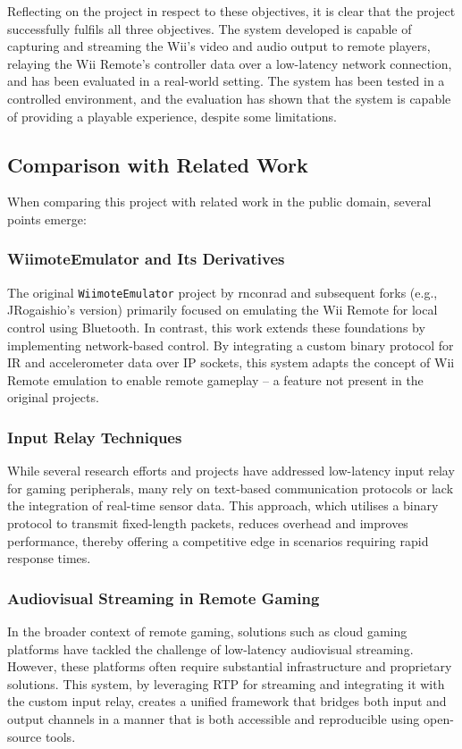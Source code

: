 Reflecting on the project in respect to these objectives, it is clear that the project successfully fulfils all three objectives. The system developed is capable of capturing and streaming the Wii’s video and audio output to remote players, relaying the Wii Remote’s controller data over a low-latency network connection, and has been evaluated in a real-world setting. The system has been tested in a controlled environment, and the evaluation has shown that the system is capable of providing a playable experience, despite some limitations.

\subsection*{Comparison with Related Work}
When comparing this project with related work in the public domain, several points emerge:

\subsubsection{WiimoteEmulator and Its Derivatives}
The original \texttt{WiimoteEmulator} project by rnconrad and subsequent forks (e.g., JRogaishio's version) primarily focused on emulating the Wii Remote for local control using Bluetooth. In contrast, this work extends these foundations by implementing network-based control. By integrating a custom binary protocol for IR and accelerometer data over IP sockets, this system adapts the concept of Wii Remote emulation to enable remote gameplay -- a feature not present in the original projects.

\subsubsection{Input Relay Techniques}
While several research efforts and projects have addressed low-latency input relay for gaming peripherals, many rely on text-based communication protocols or lack the integration of real-time sensor data. This approach, which utilises a binary protocol to transmit fixed-length packets, reduces overhead and improves performance, thereby offering a competitive edge in scenarios requiring rapid response times.

\subsubsection{Audiovisual Streaming in Remote Gaming}
In the broader context of remote gaming, solutions such as cloud gaming platforms have tackled the challenge of low-latency audiovisual streaming. However, these platforms often require substantial infrastructure and proprietary solutions. This system, by leveraging RTP for streaming and integrating it with the custom input relay, creates a unified framework that bridges both input and output channels in a manner that is both accessible and reproducible using open-source tools.

